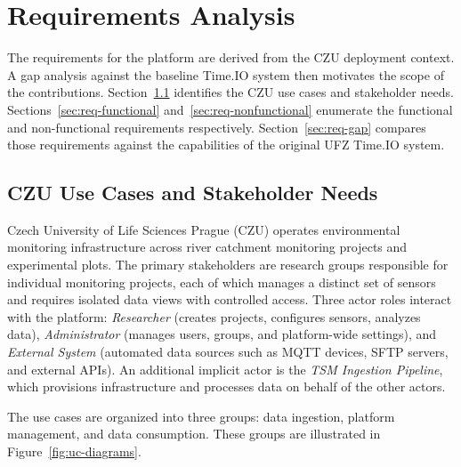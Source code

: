 \chapter{Requirements Analysis}
\label{chap:requirements}

The requirements for the platform are derived from the CZU deployment context. A gap analysis
against the baseline Time.IO system then motivates the scope of the contributions.
Section~\ref{sec:req-usecases} identifies the CZU use cases and stakeholder
needs. Sections~\ref{sec:req-functional} and~\ref{sec:req-nonfunctional} enumerate the functional and non-functional
requirements respectively. Section~\ref{sec:req-gap} compares those requirements against the capabilities of the
original UFZ Time.IO system.

\section{CZU Use Cases and Stakeholder Needs}
\label{sec:req-usecases}

Czech University of Life Sciences Prague (CZU) operates environmental monitoring infrastructure
across river catchment monitoring projects and experimental plots. The primary stakeholders are
research groups responsible for individual monitoring projects, each of which manages a distinct
set of sensors and requires isolated data views with controlled access. Three actor roles interact
with the platform: \emph{Researcher} (creates projects, configures sensors, analyzes data),
\emph{Administrator} (manages users, groups, and platform-wide settings), and
\emph{External System} (automated data sources such as MQTT devices, SFTP servers, and external
APIs). An additional implicit actor is the \emph{TSM Ingestion Pipeline}, which provisions
infrastructure and processes data on behalf of the other actors.

The use cases are organized into three groups: data ingestion, platform management, and data
consumption. These groups are illustrated in Figure~\ref{fig:uc-diagrams}.


